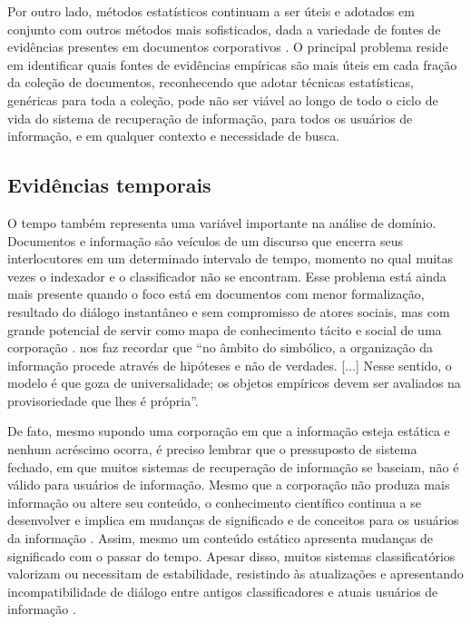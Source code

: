 Por outro lado, métodos estatísticos continuam a ser úteis e adotados em conjunto com outros métodos mais sofisticados, dada a variedade de fontes de evidências presentes em documentos corporativos \cite{relevantEnterpriseData11}. O principal problema reside em identificar quais fontes de evidências empíricas são mais úteis em cada fração da coleção de documentos, reconhecendo que adotar técnicas estatísticas, genéricas para toda a coleção, pode não ser viável ao longo de todo o ciclo de vida do sistema de recuperação de informação, para todos os usuários de informação, e em qualquer contexto e necessidade de busca.

\subsection{Evidências temporais}%
\label{evidenciasTemporais}

O tempo também representa uma variável importante na análise de domínio. Documentos e informação são veículos de um discurso que encerra seus interlocutores em um determinado intervalo de tempo, momento no qual muitas vezes o indexador e o classificador não se encontram. Esse problema está ainda mais presente quando o foco está em documentos com menor formalização, resultado do diálogo instantâneo e sem compromisso de atores sociais, mas com grande potencial de servir como mapa de conhecimento tácito e social de uma corporação \cite{southon2002}.  nos faz recordar que ``no âmbito do simbólico, a organização da informação procede através de hipóteses e não de verdades. [...] Nesse sentido, o modelo é que goza de universalidade; os objetos empíricos devem ser avaliados na provisoriedade que lhes é própria''.

De fato, mesmo supondo uma corporação em que a informação esteja estática e nenhum acréscimo ocorra, é preciso lembrar que o pressuposto de sistema fechado, em que muitos sistemas de recuperação de informação se baseiam, não é válido para usuários de informação. Mesmo que a corporação não produza mais informação ou altere seu conteúdo, o conhecimento científico continua a se desenvolver e implica em mudanças de significado e de conceitos para os usuários da informação \cite[p. 426]{hjorland2002domain}. Assim, mesmo um conteúdo estático apresenta mudanças de significado com o passar do tempo. Apesar disso, muitos sistemas classificatórios valorizam ou necessitam de estabilidade, resistindo às atualizações e apresentando incompatibilidade de diálogo entre antigos classificadores e atuais usuários de informação \cite[p. 25]{solomon2002}.

